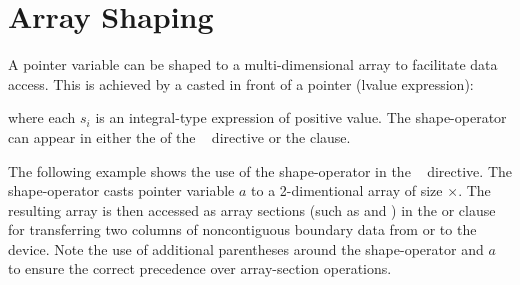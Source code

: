 \section{Array Shaping}
\label{sec:array-shaping}

\ccppspecificstart
A pointer variable can be shaped to a multi-dimensional array to facilitate
data access. This is achieved by a  casted in front of 
a pointer (lvalue expression):
\begin{description}
\item[]\hspace*{5mm}
\end{description}
where each $s_i$ is an integral-type expression of positive value.
The shape-operator can appear in either the 
of the ~ directive or the  clause.

The following example shows the use of the shape-operator in the 
~ directive. The shape-operator \code{([nx][ny+2])}
casts pointer variable $a$ to a 2-dimentional array of size
$\times$.  The resulting array is then accessed as
array sections (such as \code{[0:nx][1]} and \code{[0:nx][ny]}) 
in the  or  clause for transferring two columns of 
noncontiguous boundary data from or to the device.  
Note the use of additional parentheses
around the shape-operator and $a$ to ensure the correct precedence 
over array-section operations.

\ccppspecificend
